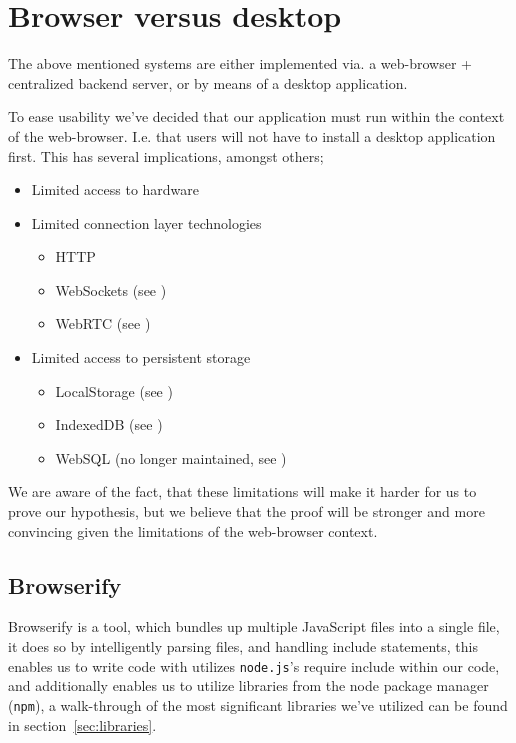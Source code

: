 \section{Browser versus desktop}
The above mentioned systems are either implemented via. a web-browser +
centralized backend server, or by means of a desktop application.

To ease usability we've decided that our application must run within the
context of the web-browser. I.e. that users will not have to install a desktop
application first. This has several implications, amongst others;
\begin{itemize}
\item Limited access to hardware
\item Limited connection layer technologies
    \begin{itemize}
        \item \acs{HTTP}
        \item WebSockets (see \citep{RFC6455})
        \item WebRTC (see \citep{WebRTC})
    \end{itemize}
\item Limited access to persistent storage
    \begin{itemize}
        \item LocalStorage (see \citep{WebStorage})
        \item IndexedDB (see \citep{IndexedDB})
        \item WebSQL (no longer maintained, see \citep{WebSQL})
    \end{itemize}
\end{itemize}
We are aware of the fact, that these limitations will make it harder for us to
prove our hypothesis, but we believe that the proof will be stronger and more
convincing given the limitations of the web-browser context.

\subsection{Browserify}
Browserify is a tool, which bundles up multiple JavaScript files into a single
file, it does so by intelligently parsing files, and handling include
statements, this enables us to write code with utilizes \verb|node.js|'s require
include within our code, and additionally enables us to utilize libraries from
the node package manager (\verb|npm|), a walk-through of the most significant 
libraries we've utilized can be found in section~\ref{sec:libraries}.

